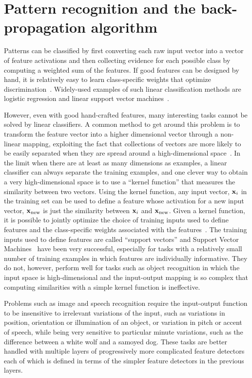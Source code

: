 \documentclass[]{article}
\begin{document}
\section{Pattern recognition and the back-propagation algorithm}

Patterns can be classified by first converting each raw input vector into a
vector of feature activations and then collecting evidence for each
possible class by computing a weighted sum of the features. If good
features can be designed by hand, it is relatively easy to learn
class-specific weights that optimize
discrimination~\citep{Rosenblatt57}. Widely-used examples of such linear
classification methods are logistic regression and linear support vector
machines~\citep{logisticregression,Boser92}.

However, even with good hand-crafted features, many interesting tasks
cannot be solved by linear classifiers. A common method to get around this
problem is to transform the feature vector into a higher dimensional vector
through a non-linear mapping, exploiting the fact that collections of
vectors are more likely to be easily separated when they are spread around
a high-dimensional space~\citep{Cover65}. In the limit when there are at least
as many dimensions as examples, a linear classifier can always separate the
training examples, and one clever way to obtain a very high-dimensional space is to use a
``kernel function'' that measures the similarity between two vectors.
Using the kernel function, any input vector, ${\bf x}_i$ in the training
set can be used to define a feature whose activation for a new input
vector, ${\bf x}_{\rm new}$ is just the similarity between ${\bf x}_i$ and
${\bf x}_{\rm new}$. Given a kernel function, it is possible to jointly
optimize the choice of training inputs used to define features and the
class-specific weights associated with the features~\citep{Boser92}. The training
inputs used to define features are called ``support vectors'' and Support
Vector Machines~\citep{Boser92} have been very successful, especially for
tasks with a relatively small number of training examples in which features
are individually informative. They do not, however, perform well for tasks
such as object recognition in which the input space is high-dimensional and
the input-output mapping is so complex that computing similarities with a
simple kernel function is ineffective.

Problems such as image and speech recognition require the input-output
function to be insensitive to irrelevant variations of the input, such as
variations in position, orientation or illumination of an object, or
variation in pitch or accent of speech, while being very sensitive to
particular minute variations, such as the difference between a white wolf
and a samoyed dog. These tasks are better handled with multiple layers of
progressively more complicated feature detectors each of which is defined
in terms of the simpler feature detectors in the previous layers.
\end{document}
